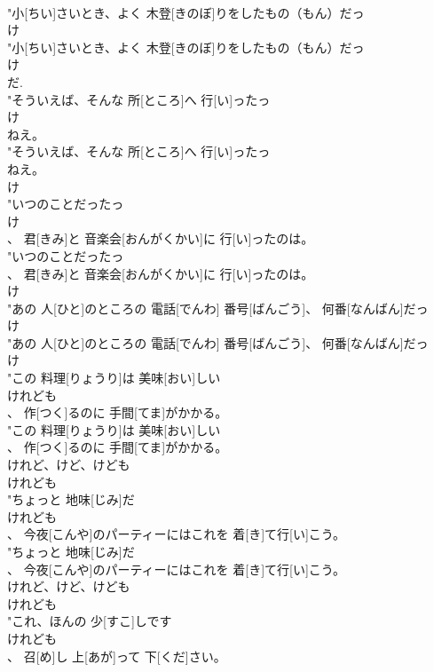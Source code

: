 \documentclass[8pt]{extreport}
\begin{document}
\begin{CJK}{UTF8}{min}
\\	"小[ちい]さいとき、よく 木登[きのぼ]りをしたもの（もん）だっ
\\	け
\\	"小[ちい]さいとき、よく 木登[きのぼ]りをしたもの（もん）だっ
\\	け
\\	だ. 
\\	"そういえば、そんな 所[ところ]へ 行[い]ったっ
\\	け
\\	ねえ。
\\	"そういえば、そんな 所[ところ]へ 行[い]ったっ
\\	ねえ。
\\	け
\\	"いつのことだったっ
\\	け
\\	、 君[きみ]と 音楽会[おんがくかい]に 行[い]ったのは。
\\	"いつのことだったっ
\\	、 君[きみ]と 音楽会[おんがくかい]に 行[い]ったのは。
\\	け
\\	"あの 人[ひと]のところの 電話[でんわ] 番号[ばんごう]、 何番[なんばん]だっ
\\	け
\\	"あの 人[ひと]のところの 電話[でんわ] 番号[ばんごう]、 何番[なんばん]だっ
\\	け
\\	"この 料理[りょうり]は 美味[おい]しい
\\	けれども
\\	、 作[つく]るのに 手間[てま]がかかる。
\\	"この 料理[りょうり]は 美味[おい]しい
\\	、 作[つく]るのに 手間[てま]がかかる。
\\	けれど、けど、けども	
\\	けれども
\\	"ちょっと 地味[じみ]だ
\\	けれども
\\	、 今夜[こんや]のパーティーにはこれを 着[き]て行[い]こう。
\\	"ちょっと 地味[じみ]だ
\\	、 今夜[こんや]のパーティーにはこれを 着[き]て行[い]こう。
\\	けれど、けど、けども	
\\	けれども
\\	"これ、ほんの 少[すこ]しです
\\	けれども
\\	、 召[め]し 上[あが]って 下[くだ]さい。

\end{CJK}
\end{document}
